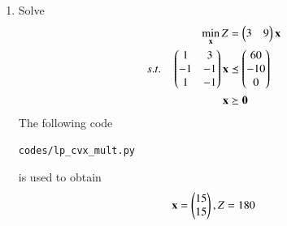 \begin{enumerate}[label=\arabic*.,ref=\thesection.\theenumi]
\begin{figure}[!ht]
\caption{}
\label{fig:lp_feas_reg}
\end{figure}

\item Solve
\begin{align}
\min_{\mathbf{x}} Z &= \begin{pmatrix}3 & 9\end{pmatrix}\mathbf{x}
\\
s.t. \quad 
\begin{pmatrix}
1 & 3
\\
-1 & -1
\\
1 & -1
\end{pmatrix}
\mathbf{x} &\preceq \begin{pmatrix}60\\-10\\0\end{pmatrix}
\\
\mathbf{x} &\succeq \mathbf{0}
\label{eq:lp_exam_mult}
\end{align}
\solution The following code
\begin{lstlisting}
codes/lp_cvx_mult.py
\end{lstlisting}
%
is used to obtain
\begin{align}
\mathbf{x} = \begin{pmatrix}15\\15\end{pmatrix}, Z = 180
\end{align}
%


\end{enumerate}
